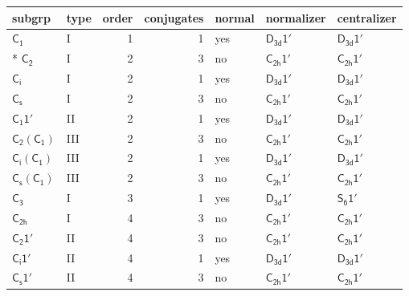 \documentclass[10pt,a4paper]{article}
\numberwithin{equation}{section}
\newcommand{\grp}[1]{\mathsf{#1}}
\begin{document}
{\small\begin{longtable}{@{}llrrlll@{}}\toprule
subgrp & type & order & conjugates & normal & normalizer & centralizer\\\midrule\endhead
\bottomrule\endfoot\endlastfoot
\href{../../../rotation/data/pdf/C1.pdf}{$\grp{C_{1}}$} & I & 1 & 1 & yes & \href{D3d-1p.pdf}{$\grp{D_{3d}1'}$} & \href{D3d-1p.pdf}{$\grp{D_{3d}1'}$}\\*
\href{../../../rotation/data/pdf/C2.pdf}{$\grp{C_{2}}$} & I & 2 & 3 & no & \href{C2h-1p.pdf}{$\grp{C_{2h}1'}$} & \href{C2h-1p.pdf}{$\grp{C_{2h}1'}$}\\
\href{../../../rotation/data/pdf/S2.pdf}{$\grp{C_{i}}$} & I & 2 & 1 & yes & \href{D3d-1p.pdf}{$\grp{D_{3d}1'}$} & \href{D3d-1p.pdf}{$\grp{D_{3d}1'}$}\\
\href{../../../rotation/data/pdf/C1v.pdf}{$\grp{C_{s}}$} & I & 2 & 3 & no & \href{C2h-1p.pdf}{$\grp{C_{2h}1'}$} & \href{C2h-1p.pdf}{$\grp{C_{2h}1'}$}\\
\href{C1-1p.pdf}{$\grp{C_{1}1'}$} & II & 2 & 1 & yes & \href{D3d-1p.pdf}{$\grp{D_{3d}1'}$} & \href{D3d-1p.pdf}{$\grp{D_{3d}1'}$}\\
\href{C2-C1.pdf}{$\grp{C_{2}}(\grp{C_{1}})$} & III & 2 & 3 & no & \href{C2h-1p.pdf}{$\grp{C_{2h}1'}$} & \href{C2h-1p.pdf}{$\grp{C_{2h}1'}$}\\
\href{S2-C1.pdf}{$\grp{C_{i}}(\grp{C_{1}})$} & III & 2 & 1 & yes & \href{D3d-1p.pdf}{$\grp{D_{3d}1'}$} & \href{D3d-1p.pdf}{$\grp{D_{3d}1'}$}\\
\href{C1v-C1.pdf}{$\grp{C_{s}}(\grp{C_{1}})$} & III & 2 & 3 & no & \href{C2h-1p.pdf}{$\grp{C_{2h}1'}$} & \href{C2h-1p.pdf}{$\grp{C_{2h}1'}$}\\
\href{../../../rotation/data/pdf/C3.pdf}{$\grp{C_{3}}$} & I & 3 & 1 & yes & \href{D3d-1p.pdf}{$\grp{D_{3d}1'}$} & \href{S6-1p.pdf}{$\grp{S_{6}1'}$}\\
\href{../../../rotation/data/pdf/C2h.pdf}{$\grp{C_{2h}}$} & I & 4 & 3 & no & \href{C2h-1p.pdf}{$\grp{C_{2h}1'}$} & \href{C2h-1p.pdf}{$\grp{C_{2h}1'}$}\\
\href{C2-1p.pdf}{$\grp{C_{2}1'}$} & II & 4 & 3 & no & \href{C2h-1p.pdf}{$\grp{C_{2h}1'}$} & \href{C2h-1p.pdf}{$\grp{C_{2h}1'}$}\\
\href{S2-1p.pdf}{$\grp{C_{i}1'}$} & II & 4 & 1 & yes & \href{D3d-1p.pdf}{$\grp{D_{3d}1'}$} & \href{D3d-1p.pdf}{$\grp{D_{3d}1'}$}\\
\href{C1v-1p.pdf}{$\grp{C_{s}1'}$} & II & 4 & 3 & no & \href{C2h-1p.pdf}{$\grp{C_{2h}1'}$} & \href{C2h-1p.pdf}{$\grp{C_{2h}1'}$}\\

\end{longtable}}
\end{document}
